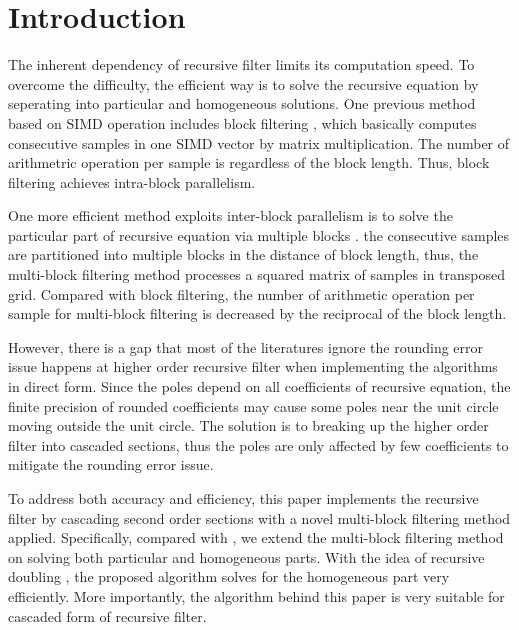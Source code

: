 \section{Introduction}
\label{sec:introduction}

The inherent dependency of recursive filter limits its computation speed.
To overcome the difficulty, the efficient way is to solve the recursive equation by seperating into
particular and homogeneous solutions.
One previous method based on SIMD operation includes block filtering \cite{Sung_86}, 
which basically computes consecutive samples in one SIMD vector by matrix multiplication. 
The number of arithmetric operation per sample is regardless of the block length. Thus, block filtering achieves
intra-block parallelism. 

One more efficient method exploits inter-block parallelism is to solve the particular part of recursive equation via multiple blocks \cite{Jaewoo_09}.
the consecutive samples are partitioned into multiple blocks in the distance of block length, thus, the multi-block filtering method
processes a squared matrix of samples in transposed grid. Compared with block filtering, the number of arithmetic operation per sample for multi-block filtering is decreased 
by the reciprocal of the block length.

However, there is a gap that most of the literatures ignore the rounding error issue happens at higher order recursive filter when implementing the algorithms in direct form.
Since the poles depend on all coefficients of recursive equation, the finite precision of rounded coefficients may cause some poles near the unit circle
moving outside the unit circle. The solution is to breaking up the higher order filter into cascaded sections, thus the poles are only affected by few coefficients to mitigate
the rounding error issue.

To address both accuracy and efficiency, this paper implements the recursive filter by cascading second order sections with a novel multi-block filtering method applied.
Specifically, compared with \cite{Jaewoo_09}, we extend the multi-block filtering method on solving both particular and homogeneous parts. With the idea of recursive doubling \cite{Kogge_73},
the proposed algorithm solves for the homogeneous part very efficiently. More importantly, the algorithm behind this paper is very suitable for cascaded form of recursive filter.


